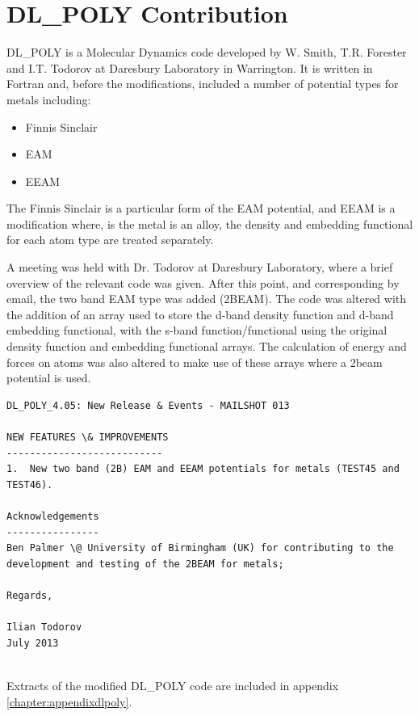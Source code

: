 \section{DL\_POLY Contribution}

DL\_POLY is a Molecular Dynamics code developed by W. Smith, T.R. Forester and I.T. Todorov at Daresbury Laboratory in Warrington. It is written in Fortran and, before the modifications, included a number of potential types for metals including:

\begin{itemize}
\item Finnis Sinclair
\item EAM
\item EEAM
\end{itemize}

The Finnis Sinclair is a particular form of the EAM potential, and EEAM is a modification where, is the metal is an alloy, the density and embedding functional for each atom type are treated separately.

A meeting was held with Dr. Todorov at Daresbury Laboratory, where a brief overview of the relevant code was given.  After this point, and corresponding by email, the two band EAM type was added (2BEAM).  The code was altered with the addition of an array used to store the d-band density function and d-band embedding functional, with the s-band function/functional using the original density function and embedding functional arrays.  The calculation of energy and forces on atoms was also altered to make use of these arrays where a \acrlong{2beam} potential is used.

\begin{lstlisting}[style=sEmail,caption={DL\_POLY 4.05 mailshot extract}]
DL_POLY_4.05: New Release & Events - MAILSHOT 013

NEW FEATURES \& IMPROVEMENTS
--------------------------- 
1.  New two band (2B) EAM and EEAM potentials for metals (TEST45 and TEST46). 

Acknowledgements
----------------
Ben Palmer \@ University of Birmingham (UK) for contributing to the
development and testing of the 2BEAM for metals;

Regards,

Ilian Todorov
July 2013 


\end{lstlisting}

Extracts of the modified DL\_POLY code are included in appendix \ref{chapter:appendixdlpoly}.




















